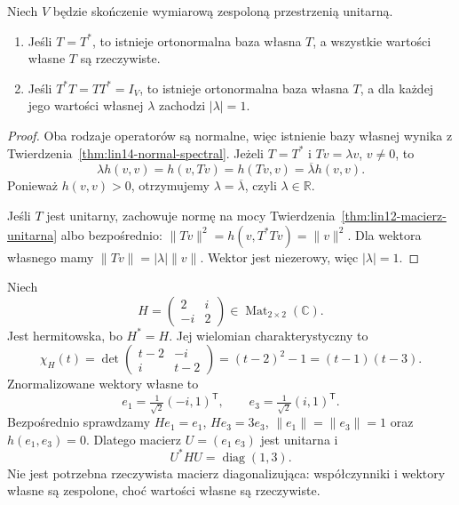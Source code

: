 \begin{wniosek}
\label{cor:lin14-hermitian-unitary}
Niech \(V\) będzie skończenie
wymiarową zespoloną przestrzenią unitarną.
\begin{enumerate}[label=(\roman*)]
\item Jeśli \(T=T^*\), to istnieje
      ortonormalna baza własna \(T\),
      a wszystkie wartości własne
      \(T\) są rzeczywiste.
\item Jeśli \(T^*T=TT^*=I_V\), to
      istnieje ortonormalna baza
      własna \(T\), a dla każdej
      jego wartości własnej
      \(\lambda\) zachodzi
      \(|\lambda|=1\).
\end{enumerate}
\end{wniosek}
\begin{proof}
Oba rodzaje operatorów są normalne,
więc istnienie bazy własnej wynika
z
Twierdzenia~\ref{thm:lin14-normal-spectral}.
Jeżeli \(T=T^*\) i \(Tv=\lambda v\),
\(v\ne0\), to
\[
 \lambda h(v,v)=h(v,Tv)
 =h(Tv,v)=\overline\lambda h(v,v).
\]
Ponieważ \(h(v,v)>0\),
otrzymujemy \(\lambda=\overline\lambda\),
czyli \(\lambda\in\mathbb R\).

Jeśli \(T\) jest unitarny,
zachowuje normę na mocy
Twierdzenia~\ref{thm:lin12-macierz-unitarna}
albo bezpośrednio:
\(\|Tv\|^2=h(v,T^*Tv)=\|v\|^2\).
Dla wektora własnego mamy
\(\|Tv\|=|\lambda|\|v\|\).
Wektor jest niezerowy, więc
\(|\lambda|=1\).
\end{proof}

\begin{przyklad}
\label{prz:lin14-hermitian2}
Niech
\[
 H=\begin{pmatrix}2&i\\-i&2\end{pmatrix}
 \in\operatorname{Mat}_{2\times2}(\mathbb C).
\]
Jest hermitowska, bo \(H^*=H\).
Jej wielomian charakterystyczny to
\[
 \chi_H(t)
 =\det\begin{pmatrix}t-2&-i\\i&t-2\end{pmatrix}
 =(t-2)^2-1=(t-1)(t-3).
\]
Znormalizowane wektory własne to
\[
 e_1=\tfrac1{\sqrt2}(-i,1)^{\mathsf T},
 \qquad
 e_3=\tfrac1{\sqrt2}(i,1)^{\mathsf T}.
\]
Bezpośrednio sprawdzamy
\(He_1=e_1\), \(He_3=3e_3\),
\(\|e_1\|=\|e_3\|=1\)
oraz \(h(e_1,e_3)=0\).
Dlatego macierz
\(U=(e_1\ e_3)\) jest unitarna i
\[
 U^*HU=\operatorname{diag}(1,3).
\]
Nie jest potrzebna rzeczywista
macierz diagonalizująca:
współczynniki i wektory własne
są zespolone, choć wartości własne
są rzeczywiste.
\end{przyklad}

